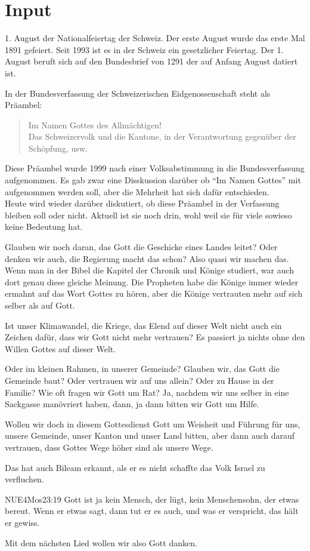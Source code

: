 \documentclass{../../inc/mybib}
\begin{document}
\section{ Input }
\begin{spacing}{1.5}
1. August der Nationalfeiertag der Schweiz. Der erste August wurde das erste Mal 1891 gefeiert. Seit 1993 ist es in der Schweiz ein gesetzlicher Feiertag. Der 1. August beruft sich auf den Bundesbrief von 1291 der auf Anfang August datiert ist.

In der Bundesverfassung der Schweizerischen Eidgenossenschaft steht als Präambel:
\begin{quote}
Im Namen Gottes des Allmächtigen!\\
Das Schweizervolk und die Kantone, in der Verantwortung gegenüber der Schöpfung, usw.
\end{quote}
Diese Präambel wurde 1999 nach einer Volksabstimmung in die Bundesverfassung aufgenommen. Es gab zwar eine Disskussion darüber ob \enquote{Im Namen Gottes} mit aufgenommen werden soll, aber die Mehrheit hat sich dafür entschieden.\\
Heute wird wieder darüber diskutiert, ob diese Präambel in der Verfassung bleiben soll oder nicht. Aktuell ist sie noch drin, wohl weil sie für viele sowieso keine Bedeutung hat.

Glauben wir noch daran, das Gott die Geschicke eines Landes leitet? Oder denken wir auch, die Regierung macht das schon? Also quasi wir machen das. Wenn man in der Bibel die Kapitel der Chronik und Könige studiert, war auch dort genau diese gleiche Meinung. Die Propheten habe die Könige immer wieder ermahnt auf das Wort Gottes zu hören, aber die Könige vertrauten mehr auf sich selber als auf Gott. 

Ist unser Klimawandel, die Kriege, das Elend auf dieser Welt nicht auch ein Zeichen dafür, dass wir Gott nicht mehr vertrauen? Es passiert ja nichts ohne den Willen Gottes auf dieser Welt.

Oder im kleinen Rahmen, in unserer Gemeinde? Glauben wir, das Gott die Gemeinde baut? Oder vertrauen wir auf uns allein? Oder zu Hause in der Familie? Wie oft fragen wir Gott um Rat? Ja, nachdem wir uns selber in eine Sackgasse manövriert haben, dann, ja dann bitten wir Gott um Hilfe.

Wollen wir doch in diesem Gottesdienst Gott um Weisheit und Führung für uns, unsere Gemeinde, unser Kanton und unser Land bitten, aber dann auch darauf vertrauen, dass Gottes Wege höher sind als unsere Wege.

Das hat auch Bileam erkannt, als er es nicht schaffte das Volk Israel zu verfluchen.
\begin{bibelbox}{NUE}{4Mos}{23:19}
    Gott ist ja kein Mensch, der lügt, kein Menschensohn, der etwas bereut. Wenn er etwas sagt, dann tut er es auch, und was er verspricht, das hält er gewiss.
\end{bibelbox}

Mit dem nächsten Lied wollen wir also Gott danken.
\end{spacing}
\end{document}

